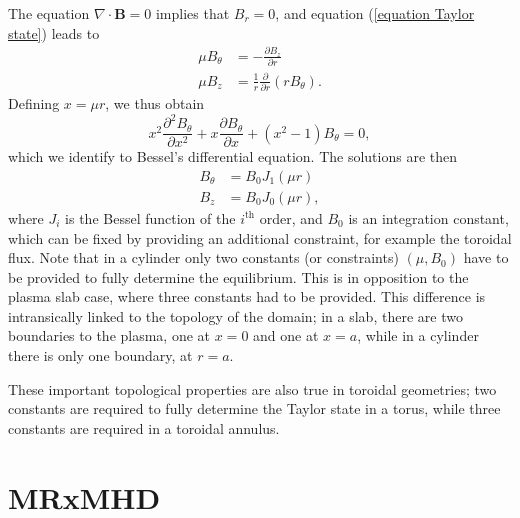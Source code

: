 \documentclass[my_thesis.tex]{subfiles}
\begin{document}
The equation $\nabla\cdot\mathbf{B}=0$ implies that $B_r=0$, and equation (\ref{equation Taylor state}) leads to
\begin{align}
	\mu B_\theta &= -\frac{\partial B_z}{\partial r}\\
	\mu B_z &= \frac{1}{r}\frac{\partial}{\partial r}(rB_\theta).
\end{align}
Defining $x=\mu r$, we thus obtain
\begin{equation}
	x^2 \frac{\partial^2 B_\theta}{\partial x^2} + x \frac{\partial B_\theta}{\partial x} + (x^2-1) B_\theta = 0,
\end{equation}
which we identify to Bessel's differential equation. The solutions are then
\begin{align}
	B_\theta &= B_0 J_1(\mu r)\\
	B_z &= B_0 J_0(\mu r),
\end{align}
where $J_i$ is the Bessel function of the $i^{\text{th}}$ order, and $B_0$ is an integration constant, which can be fixed by providing an additional constraint, for example the toroidal flux. Note that in a cylinder only two constants (or constraints) $(\mu,B_0)$ have to be provided to fully determine the equilibrium. This is in opposition to the plasma slab case, where three constants had to be provided. This difference is intransically linked to the topology of the domain; in a slab, there are two boundaries to the plasma, one at $x=0$ and one at $x=a$, while in a cylinder there is only one boundary, at $r=a$. 

These important topological properties are also true in toroidal geometries; two constants are required to fully determine the Taylor state in a torus, while three constants are required in a toroidal annulus.

\section{MRxMHD}
\label{section mrxmhd}
\end{document}

